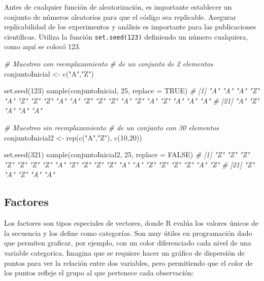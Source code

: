 \documentclass[
]{article}
\newenvironment{Shaded}{\begin{snugshade}}{\end{snugshade}}
\newcommand{\AttributeTok}[1]{\textcolor[rgb]{0.77,0.63,0.00}{#1}}
\newcommand{\CommentTok}[1]{\textcolor[rgb]{0.56,0.35,0.01}{\textit{#1}}}
\newcommand{\ConstantTok}[1]{\textcolor[rgb]{0.00,0.00,0.00}{#1}}
\newcommand{\DecValTok}[1]{\textcolor[rgb]{0.00,0.00,0.81}{#1}}
\newcommand{\FunctionTok}[1]{\textcolor[rgb]{0.00,0.00,0.00}{#1}}
\newcommand{\NormalTok}[1]{#1}
\newcommand{\OtherTok}[1]{\textcolor[rgb]{0.56,0.35,0.01}{#1}}
\newcommand{\StringTok}[1]{\textcolor[rgb]{0.31,0.60,0.02}{#1}}
\theoremstyle{definition}
\theoremstyle{definition}
\theoremstyle{definition}
\theoremstyle{definition}
\theoremstyle{remark}
\begin{document}
\begin{rmdnote}
Antes de cualquier función de aleatorización, es importante establecer un conjunto de números aleatorios para que el código sea replicable. Asegurar replicabilidad de los experimentos y análisis es importante para las publicaciones científicas. Utiliza la función \texttt{set.seed(123)} definiendo un número cualquiera, como aquí se colocó 123.
\end{rmdnote}

\begin{Shaded}
\begin{Highlighting}[]
\CommentTok{\# Muestreo con reemplazamiento}
\CommentTok{\# de un conjunto de 2 elementos}
\NormalTok{conjuntoInicial }\OtherTok{\textless{}{-}} \FunctionTok{c}\NormalTok{(}\StringTok{"A"}\NormalTok{,}\StringTok{"Z"}\NormalTok{)}

\FunctionTok{set.seed}\NormalTok{(}\DecValTok{123}\NormalTok{)}
\FunctionTok{sample}\NormalTok{(conjuntoInicial, }\DecValTok{25}\NormalTok{, }\AttributeTok{replace =} \ConstantTok{TRUE}\NormalTok{)}
\CommentTok{\#  [1] "A" "A" "A" "Z" "A" "Z" "Z" "Z" "A" "A" "Z" "Z" "Z" "A" "Z" "A" "Z" "A" "A" "A"}
\CommentTok{\# [21] "A" "Z" "A" "A" "A"}

\CommentTok{\# Muestreo sin reemplazamiento}
\CommentTok{\# de un conjunto con 30 elementos}
\NormalTok{conjuntoInicial2 }\OtherTok{\textless{}{-}} \FunctionTok{rep}\NormalTok{(}\FunctionTok{c}\NormalTok{(}\StringTok{"A"}\NormalTok{,}\StringTok{"Z"}\NormalTok{), }\FunctionTok{c}\NormalTok{(}\DecValTok{10}\NormalTok{,}\DecValTok{20}\NormalTok{))}

\FunctionTok{set.seed}\NormalTok{(}\DecValTok{321}\NormalTok{)}
\FunctionTok{sample}\NormalTok{(conjuntoInicial2, }\DecValTok{25}\NormalTok{, }\AttributeTok{replace =} \ConstantTok{FALSE}\NormalTok{)}
\CommentTok{\#  [1] "Z" "Z" "Z" "Z" "Z" "Z" "Z" "A" "Z" "Z" "Z" "Z" "A" "A" "Z" "Z" "Z" "Z" "A" "Z"}
\CommentTok{\# [21] "Z" "A" "Z" "A" "A"}
\end{Highlighting}
\end{Shaded}

\hypertarget{factores}{%
\subsection{Factores}\label{factores}}

Los factores son tipos especiales de vectores, donde R evalúa los valores únicos de la secuencia y los define como categorías. Son muy útiles en programación dado que permiten graficar, por ejemplo, con un color diferenciado cada nivel de una variable categorica. Imagina que se requiere hacer un gráfico de dispersión de puntos para ver la relación entre dos variables, pero permitiendo que el color de los puntos refleje el grupo al que pertenece cada observación:
\end{document}
